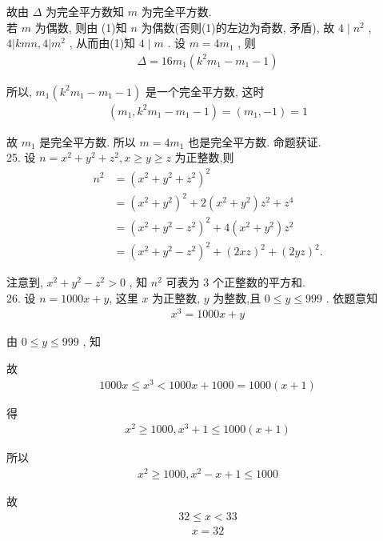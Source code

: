 故由 $\Delta$ 为完全平方数知 $m$ 为完全平方数. \\
若 $m$ 为偶数, 则由 (1)知 $n$ 为偶数(否则(1)的左边为奇数, 矛盾), 故 $4 \mid n^{2}$ ,  $4|k m n ,  4| m^{2}$ , 从而由(1)知 $4 \mid m$ . 设 $m=4 m_{1}$ , 则
\begin{align*}
	\Delta=16 m_{1}\left(k^{2} m_{1}-m_{1}-1\right)
\end{align*}

所以, $m_{1}\left(k^{2} m_{1}-m_{1}-1\right)$ 是一个完全平方数, 这时
\begin{align*}
	\left(m_{1}, k^{2} m_{1}-m_{1}-1\right)=\left(m_{1},-1\right)=1
\end{align*}

故 $m_{1}$ 是完全平方数. 所以 $m=4 m_{1}$ 也是完全平方数. 命题获证.\\
25. 设 $n=x^{2}+y^{2}+z^{2}, x \geqslant y \geqslant z$ 为正整数,则\begin{align}
	n^{2} & =\left(x^{2}+y^{2}+z^{2}\right)^{2}                                 \\
	      & =\left(x^{2}+y^{2}\right)^{2}+2\left(x^{2}+y^{2}\right) z^{2}+z^{4} \\
	      & =\left(x^{2}+y^{2}-z^{2}\right)^{2}+4\left(x^{2}+y^{2}\right) z^{2} \\
	      & =\left(x^{2}+y^{2}-z^{2}\right)^{2}+(2 x z)^{2}+(2 y z)^{2} .
\end{align}

注意到,  $x^{2}+y^{2}-z^{2}>0$ , 知 $n^{2}$ 可表为 3 个正整数的平方和. \\
26. 设 $n=1000 x+y$, 这里 $x$ 为正整数, $y$ 为整数,且 $0 \leqslant y \leqslant 999$ . 依题意知
\begin{align*}
	x^{3}=1000 x+y
\end{align*}

由 $0 \leqslant y \leqslant 999$ , 知

故
\begin{align*}
	1000 x \leqslant x^{3}<1000 x+1000=1000(x+1)
\end{align*}

得
\begin{align*}
	x^{2} \geqslant 1000, x^{3}+1 \leqslant 1000(x+1)
\end{align*}

所以
\begin{align*}
	x^{2} \geqslant 1000, x^{2}-x+1 \leqslant 1000
\end{align*}

故
\begin{align*}
	32 \leqslant x<33
\end{align*}
\begin{align*}
	x=32
\end{align*}

